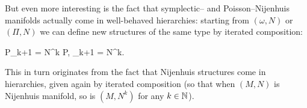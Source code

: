 \documentclass[main.tex]{subfiles}
\begin{document}
But even more interesting is the fact that symplectic-- and Poisson--Nijenhuis manifolds actually come in well-behaved hierarchies: starting from $(\omega, N)$ or $(\Pi, N)$ we can define new structures of the same type by iterated composition:
\begin{eqalign}
	P_{k+1} = N^k P, \quad \Omega_{k+1} = \Omega N^k.
\end{eqalign}
This in turn originates from the fact that Nijenhuis structures come in hierarchies, given again by iterated composition (so that when $(M,N)$ is Nijenhuis manifold, so is $(M, N^k)$ for any $k \in \mathbb{N}$).




\end{document}

